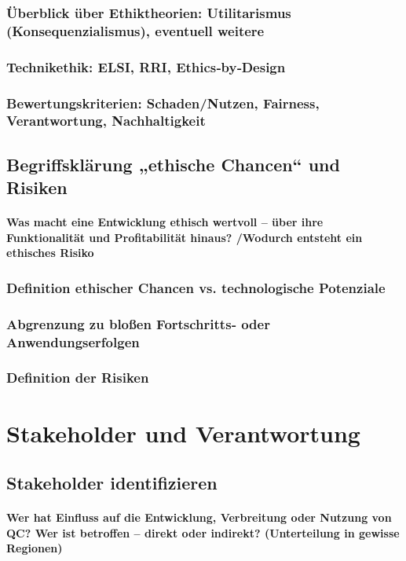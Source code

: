 \subsubsection{Überblick über Ethiktheorien: Utilitarismus (Konsequenzialismus), eventuell weitere}
\subsubsection{Technikethik: ELSI, RRI, Ethics‑by‑Design}
\subsubsection{Bewertungskriterien: Schaden/Nutzen, Fairness, Verantwortung, Nachhaltigkeit}


\subsection{Begriffsklärung „ethische Chancen“ und Risiken}
\paragraph{Was macht eine Entwicklung ethisch wertvoll – über ihre Funktionalität und Profitabilität hinaus? /Wodurch entsteht ein ethisches Risiko}

\subsubsection{Definition ethischer Chancen vs. technologische Potenziale}
\subsubsection{Abgrenzung zu bloßen Fortschritts‑ oder Anwendungserfolgen}
\subsubsection{Definition der Risiken}



\section{Stakeholder und Verantwortung}

\subsection{Stakeholder identifizieren}
\paragraph{Wer hat Einfluss auf die Entwicklung, Verbreitung oder Nutzung von QC? 
Wer ist betroffen – direkt oder indirekt?
(Unterteilung in gewisse Regionen)}

